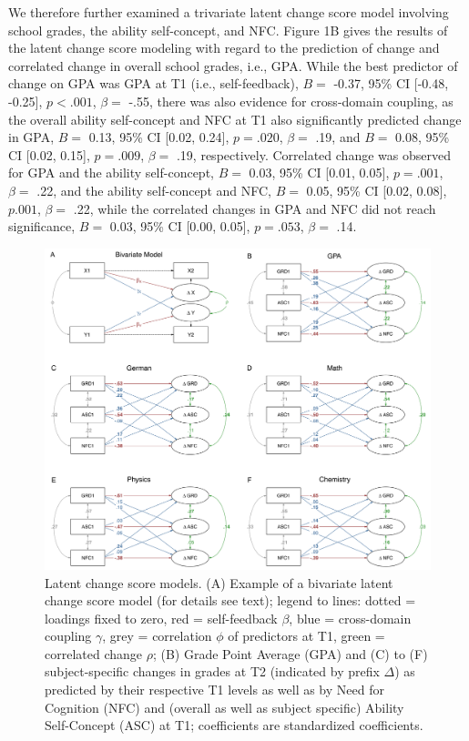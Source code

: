 \documentclass[
  man]{apa6}
\begin{document}
We therefore further examined a trivariate latent change score model involving school grades, the ability self-concept, and NFC. Figure 1B gives the results of the latent change score modeling with regard to the prediction of change and correlated change in overall school grades, i.e., GPA. While the best predictor of change on GPA was GPA at T1 (i.e., self-feedback), \(B=\) -0.37, 95\% CI {[}-0.48, -0.25{]}, \(p< .001\), \(\beta=\) -.55, there was also evidence for cross-domain coupling, as the overall ability self-concept and NFC at T1 also significantly predicted change in GPA, \(B=\) 0.13, 95\% CI {[}0.02, 0.24{]}, \(p=.020\), \(\beta=\) .19, and \(B=\) 0.08, 95\% CI {[}0.02, 0.15{]}, \(p=.009\), \(\beta=\) .19, respectively. Correlated change was observed for GPA and the ability self-concept, \(B=\) 0.03, 95\% CI {[}0.01, 0.05{]}, \(p=.001\), \(\beta=\) .22, and the ability self-concept and NFC, \(B=\) 0.05, 95\% CI {[}0.02, 0.08{]}, \(p.001\), \(\beta=\) .22, while the correlated changes in GPA and NFC did not reach significance, \(B=\) 0.03, 95\% CI {[}0.00, 0.05{]}, \(p=.053\), \(\beta=\) .14.

\begin{figure}
\centering
\includegraphics{"Fig1.jpg"}
\caption{Latent change score models. (A) Example of a bivariate latent change score model (for details see text); legend to lines: dotted = loadings fixed to zero, red = self-feedback \(\beta\), blue = cross-domain coupling \(\gamma\), grey = correlation \(\phi\) of predictors at T1, green = correlated change \(\rho\); (B) Grade Point Average (GPA) and (C) to (F) subject-specific changes in grades at T2 (indicated by prefix \(\Delta\)) as predicted by their respective T1 levels as well as by Need for Cognition (NFC) and (overall as well as subject specific) Ability Self-Concept (ASC) at T1; coefficients are standardized coefficients.}
\end{figure}
\end{document}
